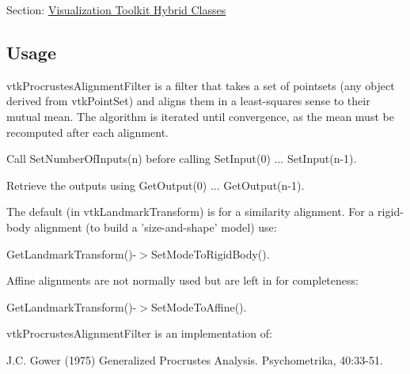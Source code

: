 Section\-: \hyperlink{sec_vtkhybrid}{Visualization Toolkit Hybrid Classes} \hypertarget{vtkwidgets_vtkxyplotwidget_Usage}{}\subsection{Usage}\label{vtkwidgets_vtkxyplotwidget_Usage}
vtk\-Procrustes\-Alignment\-Filter is a filter that takes a set of pointsets (any object derived from vtk\-Point\-Set) and aligns them in a least-\/squares sense to their mutual mean. The algorithm is iterated until convergence, as the mean must be recomputed after each alignment.

Call Set\-Number\-Of\-Inputs(n) before calling Set\-Input(0) ... Set\-Input(n-\/1).

Retrieve the outputs using Get\-Output(0) ... Get\-Output(n-\/1).

The default (in vtk\-Landmark\-Transform) is for a similarity alignment. For a rigid-\/body alignment (to build a 'size-\/and-\/shape' model) use\-:

Get\-Landmark\-Transform()-\/$>$Set\-Mode\-To\-Rigid\-Body().

Affine alignments are not normally used but are left in for completeness\-:

Get\-Landmark\-Transform()-\/$>$Set\-Mode\-To\-Affine().

vtk\-Procrustes\-Alignment\-Filter is an implementation of\-:

J.\-C. Gower (1975) Generalized Procrustes Analysis. Psychometrika, 40\-:33-\/51.

